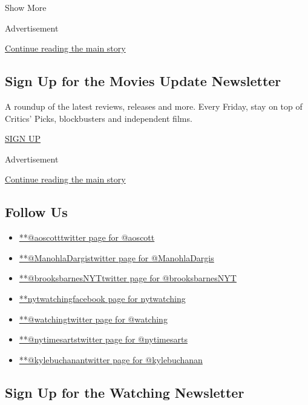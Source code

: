 Show More

Advertisement

\protect\hyperlink{after-mid2}{Continue reading the main story}

\hypertarget{sign-up-for-the-movies-update-newsletter}{%
\subsection{Sign Up for the Movies Update
Newsletter}\label{sign-up-for-the-movies-update-newsletter}}

A roundup of the latest reviews, releases and more. Every Friday, stay
on top of Critics' Picks, blockbusters and independent films.

\href{/newsletters/signup/FM}{SIGN UP}

Advertisement

\protect\hyperlink{after-mktg}{Continue reading the main story}

\hypertarget{follow-us}{%
\subsection{Follow Us}\label{follow-us}}

\begin{itemize}
\tightlist
\item
  \href{https://twitter.com/aoscott}{**@aoscotttwitter page for
  @aoscott}
\item
  \href{https://twitter.com/ManohlaDargis}{**@ManohlaDargistwitter page
  for @ManohlaDargis}
\item
  \href{https://twitter.com/brooksbarnesNYT}{**@brooksbarnesNYTtwitter
  page for @brooksbarnesNYT}
\item
  \href{https://www.facebookcorewwwi.onion/nytwatching}{**nytwatchingfacebook
  page for nytwatching}
\item
  \href{https://twitter.com/watching}{**@watchingtwitter page for
  @watching}
\item
  \href{https://twitter.com/nytimesarts}{**@nytimesartstwitter page for
  @nytimesarts}
\item
  \href{https://twitter.com/kylebuchanan}{**@kylebuchanantwitter page
  for @kylebuchanan}
\end{itemize}

\hypertarget{sign-up-for-the-watching-newsletter}{%
\subsection{Sign Up for the Watching
Newsletter}\label{sign-up-for-the-watching-newsletter}}

